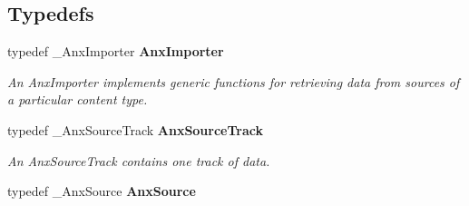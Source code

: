 \subsection*{Typedefs}
\begin{CompactItemize}
\item 
typedef \_\-Anx\-Importer {\bf Anx\-Importer}\label{anx__import_8h_a0}

\begin{CompactList}\small\item\em An Anx\-Importer implements generic functions for retrieving data from sources of a particular content type. \item\end{CompactList}\item 
typedef \_\-Anx\-Source\-Track {\bf Anx\-Source\-Track}\label{anx__import_8h_a1}

\begin{CompactList}\small\item\em An Anx\-Source\-Track contains one track of data. \item\end{CompactList}\item 
typedef \_\-Anx\-Source {\bf Anx\-Source}\label{anx__import_8h_a2}


\end{CompactItemize}
